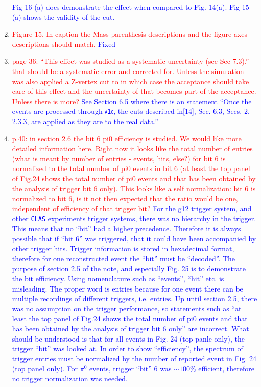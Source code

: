 \documentclass[11pt,a4paper]{article}
\newcommand{\abbr}[1]{\textsc{\texttt{#1}}}
\begin{document}
\begin{enumerate}
\textcolor{blue}{Fig 16 (a) does demonstrate the effect when compared to Fig. 14(a). Fig 15 (a) shows the validity of the cut.}
\item
\textcolor{red}{Figure 15. In caption the Mass parenthesis descriptions and the figure axes descriptions should match.}
\textcolor{blue}{Fixed}
\item
\textcolor{red}{page 36. ``This effect was studied as a systematic uncertainty (see Sec 7.3).'' that should be a systematic error and corrected for. Unless the simulation was also applied a Z-vertex cut to in which case the acceptance should take care of this effect and the uncertainty of that becomes part of the acceptance. Unless there is more?}
\textcolor{blue}{See Section 6.5 where there is an statement ``Once the events are processed through \abbr{a1c}, the cuts described in[14], Sec. 6.3, Secs. 2, 2.3.3, are applied as they are to the real data.'' }
\item
\textcolor{red}{ p.40: in section 2.6 the bit 6 pi0 efficiency is studied. We would like more detailed information here. Right now it looks like the total number of entries (what is meant by number of entries - events, hits, else?) for bit 6 is normalized to the total number of pi0 events in bit 6 (at least the top panel of Fig.24 shows the total number of pi0 events and that has been obtained by the analysis of trigger bit 6 only). This looks like a self normalization: bit 6 is normalized to bit 6, is it not then expected that the ratio would be one, independent of efficiency of that trigger bit?}
\textcolor{blue}{For the g12 trigger system, and other \abbr{CLAS} experiments trigger systems, there was no hierarchy in the trigger. This means that no ``bit'' had a higher precedence. Therefore it is always possible that if ``bit 6'' was triggered, that it could have been accompanied by other trigger hits. Trigger information is stored in hexadecimal format, therefore for one reconstructed event the ``bit'' must be ``decoded''. The purpose of section 2.5 of the note, and especially Fig. 25 is to demonstrate the bit efficiency. Using nomenclature such as ``events'', ``hit'' etc. is misleading. The proper word is entries because for one event there can be multiple recordings of different triggers, i.e. entries. Up until section 2.5, there was no assumption on the trigger performance, so statements such as ``at least the top panel of Fig.24 shows the total number of pi0 events and that has been obtained by the analysis of trigger bit 6 only'' are incorrect. What should be understood is that for all events in Fig. 24 (top panle only), the trigger ``bit'' was looked at. In order to show ``efficiency'', the spectrum of trigger entries must be normalized by the number of reported event in Fig. 24 (top panel only). For $\pi^0$ events, trigger ``bit'' 6 was $\sim 100 \%$ efficient, therefore no trigger normalization was needed.}

\end{enumerate}
\end{document}
